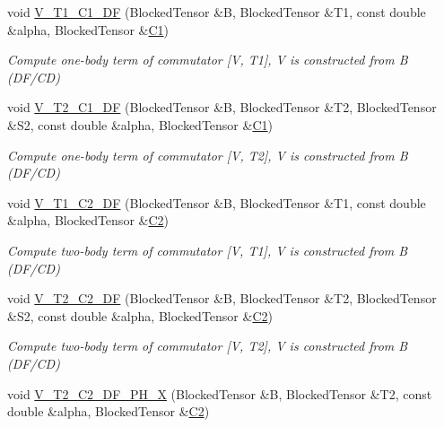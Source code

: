 \begin{DoxyCompactItemize}
void \mbox{\hyperlink{classforte_1_1_s_a_d_s_r_g_ae3f5925bdf9da1da392d3cab1230767f}{V\+\_\+\+T1\+\_\+\+C1\+\_\+\+DF}} (Blocked\+Tensor \&B, Blocked\+Tensor \&T1, const double \&alpha, Blocked\+Tensor \&\mbox{\hyperlink{namespaceforte_abe00ec86d0015c0f2b6ac298c6e428e4a1a2ddc2db4693cfd16d534cde5572cc1}{C1}})
\begin{DoxyCompactList}\small\item\em Compute one-\/body term of commutator \mbox{[}V, T1\mbox{]}, V is constructed from B (D\+F/\+CD) \end{DoxyCompactList}\item 
void \mbox{\hyperlink{classforte_1_1_s_a_d_s_r_g_af0953079e40984f5905e1c9e711b4315}{V\+\_\+\+T2\+\_\+\+C1\+\_\+\+DF}} (Blocked\+Tensor \&B, Blocked\+Tensor \&T2, Blocked\+Tensor \&S2, const double \&alpha, Blocked\+Tensor \&\mbox{\hyperlink{namespaceforte_abe00ec86d0015c0f2b6ac298c6e428e4a1a2ddc2db4693cfd16d534cde5572cc1}{C1}})
\begin{DoxyCompactList}\small\item\em Compute one-\/body term of commutator \mbox{[}V, T2\mbox{]}, V is constructed from B (D\+F/\+CD) \end{DoxyCompactList}\item 
void \mbox{\hyperlink{classforte_1_1_s_a_d_s_r_g_a9498f1d6439fa990e7cd018c7439526b}{V\+\_\+\+T1\+\_\+\+C2\+\_\+\+DF}} (Blocked\+Tensor \&B, Blocked\+Tensor \&T1, const double \&alpha, Blocked\+Tensor \&\mbox{\hyperlink{namespaceforte_abe00ec86d0015c0f2b6ac298c6e428e4af1a543f5a2c5d49bc5dde298fcf716e4}{C2}})
\begin{DoxyCompactList}\small\item\em Compute two-\/body term of commutator \mbox{[}V, T1\mbox{]}, V is constructed from B (D\+F/\+CD) \end{DoxyCompactList}\item 
void \mbox{\hyperlink{classforte_1_1_s_a_d_s_r_g_a3de5f31e3f5aaa27389cdab8f704d46e}{V\+\_\+\+T2\+\_\+\+C2\+\_\+\+DF}} (Blocked\+Tensor \&B, Blocked\+Tensor \&T2, Blocked\+Tensor \&S2, const double \&alpha, Blocked\+Tensor \&\mbox{\hyperlink{namespaceforte_abe00ec86d0015c0f2b6ac298c6e428e4af1a543f5a2c5d49bc5dde298fcf716e4}{C2}})
\begin{DoxyCompactList}\small\item\em Compute two-\/body term of commutator \mbox{[}V, T2\mbox{]}, V is constructed from B (D\+F/\+CD) \end{DoxyCompactList}\item 
void \mbox{\hyperlink{classforte_1_1_s_a_d_s_r_g_a9fb7c6e7068a079650039097e4e4e929}{V\+\_\+\+T2\+\_\+\+C2\+\_\+\+D\+F\+\_\+\+P\+H\+\_\+X}} (Blocked\+Tensor \&B, Blocked\+Tensor \&T2, const double \&alpha, Blocked\+Tensor \&\mbox{\hyperlink{namespaceforte_abe00ec86d0015c0f2b6ac298c6e428e4af1a543f5a2c5d49bc5dde298fcf716e4}{C2}})

\end{DoxyCompactItemize}
